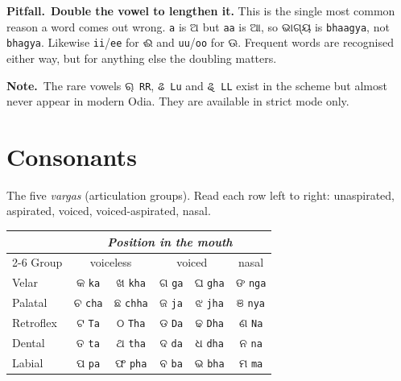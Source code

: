 \documentclass[11pt, a4paper]{article}
\newcommand{\od}[1]{{\odiafont #1}}          %
\newcommand{\odb}[1]{{\odiafont\large #1}}   %
\newcommand{\kpit}{{\color{midseaorange!85!black}\textbf{\textsf{Pitfall.}}}\ }
\newcommand{\knote}{{\color{headerblue}\textbf{\textsf{Note.}}}\ }
\begin{document}
\begin{warnbox}
\kpit \textbf{Double the vowel to lengthen it.} This is the single most common reason a
word comes out wrong. \texttt{a} is \od{ଅ} but \texttt{aa} is \od{ଆ}, so \od{ଭାଗ୍ୟ} is
\texttt{bhaagya}, not \texttt{bhagya}. Likewise \texttt{ii}/\texttt{ee} for \od{ଈ} and
\texttt{uu}/\texttt{oo} for \od{ଊ}. Frequent words are recognised either way, but for
anything else the doubling matters.
\end{warnbox}

\begin{notebox}
\knote The rare vowels \od{ୠ}~\texttt{RR}, \od{ଌ}~\texttt{Lu} and \od{ୡ}~\texttt{LL}
exist in the scheme but almost never appear in modern Odia. They are available in strict
mode only.
\end{notebox}

\section{Consonants}

The five \emph{vargas} (articulation groups). Read each row left to right: unaspirated,
aspirated, voiced, voiced-aspirated, nasal.

\begin{center}
\begin{tabular}{l c c c c c}
\toprule
& \multicolumn{5}{c}{\textit{Position in the mouth}} \\
\cmidrule(l){2-6}
Group & \multicolumn{2}{c}{voiceless} & \multicolumn{2}{c}{voiced} & nasal \\
\midrule
Velar     & \odb{କ} \texttt{ka} & \odb{ଖ} \texttt{kha} & \odb{ଗ} \texttt{ga} & \odb{ଘ} \texttt{gha} & \odb{ଙ} \texttt{nga} \\
Palatal   & \odb{ଚ} \texttt{cha} & \odb{ଛ} \texttt{chha} & \odb{ଜ} \texttt{ja} & \odb{ଝ} \texttt{jha} & \odb{ଞ} \texttt{nya} \\
Retroflex & \odb{ଟ} \texttt{Ta} & \odb{ଠ} \texttt{Tha} & \odb{ଡ} \texttt{Da} & \odb{ଢ} \texttt{Dha} & \odb{ଣ} \texttt{Na} \\
Dental    & \odb{ତ} \texttt{ta} & \odb{ଥ} \texttt{tha} & \odb{ଦ} \texttt{da} & \odb{ଧ} \texttt{dha} & \odb{ନ} \texttt{na} \\
Labial    & \odb{ପ} \texttt{pa} & \odb{ଫ} \texttt{pha} & \odb{ବ} \texttt{ba} & \odb{ଭ} \texttt{bha} & \odb{ମ} \texttt{ma} \\
\bottomrule
\end{tabular}
\end{center}
\end{document}
